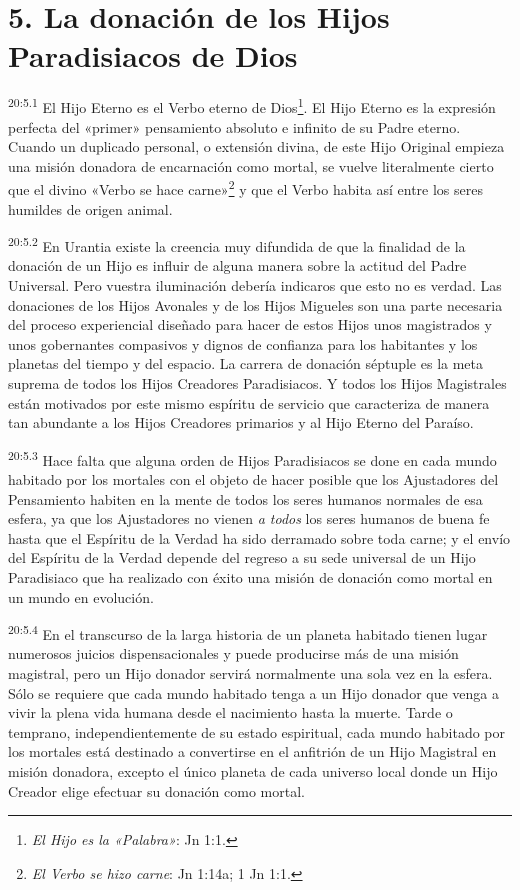 \section*{5. La donación de los Hijos Paradisiacos de Dios}
\par
\textsuperscript{20:5.1} El Hijo Eterno es el Verbo eterno de Dios\footnote{\textit{El Hijo es la «Palabra»}: Jn 1:1.}. El Hijo Eterno es la expresión perfecta del «primer» pensamiento absoluto e infinito de su Padre eterno. Cuando un duplicado personal, o extensión divina, de este Hijo Original empieza una misión donadora de encarnación como mortal, se vuelve literalmente cierto que el divino «Verbo se hace carne»\footnote{\textit{El Verbo se hizo carne}: Jn 1:14a; 1 Jn 1:1.} y que el Verbo habita así entre los seres humildes de origen animal.

\par
\textsuperscript{20:5.2} En Urantia existe la creencia muy difundida de que la finalidad de la donación de un Hijo es influir de alguna manera sobre la actitud del Padre Universal. Pero vuestra iluminación debería indicaros que esto no es verdad. Las donaciones de los Hijos Avonales y de los Hijos Migueles son una parte necesaria del proceso experiencial diseñado para hacer de estos Hijos unos magistrados y unos gobernantes compasivos y dignos de confianza para los habitantes y los planetas del tiempo y del espacio. La carrera de donación séptuple es la meta suprema de todos los Hijos Creadores Paradisiacos. Y todos los Hijos Magistrales están motivados por este mismo espíritu de servicio que caracteriza de manera tan abundante a los Hijos Creadores primarios y al Hijo Eterno del Paraíso.

\par
\textsuperscript{20:5.3} Hace falta que alguna orden de Hijos Paradisiacos se done en cada mundo habitado por los mortales con el objeto de hacer posible que los Ajustadores del Pensamiento habiten en la mente de todos los seres humanos normales de esa esfera, ya que los Ajustadores no vienen \textit{a todos} los seres humanos de buena fe hasta que el Espíritu de la Verdad ha sido derramado sobre toda carne; y el envío del Espíritu de la Verdad depende del regreso a su sede universal de un Hijo Paradisiaco que ha realizado con éxito una misión de donación como mortal en un mundo en evolución.

\par
\textsuperscript{20:5.4} En el transcurso de la larga historia de un planeta habitado tienen lugar numerosos juicios dispensacionales y puede producirse más de una misión magistral, pero un Hijo donador servirá normalmente una sola vez en la esfera. Sólo se requiere que cada mundo habitado tenga a un Hijo donador que venga a vivir la plena vida humana desde el nacimiento hasta la muerte. Tarde o temprano, independientemente de su estado espiritual, cada mundo habitado por los mortales está destinado a convertirse en el anfitrión de un Hijo Magistral en misión donadora, excepto el único planeta de cada universo local donde un Hijo Creador elige efectuar su donación como mortal.

